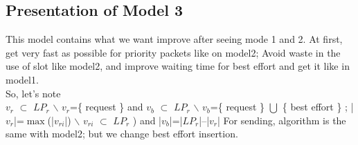 \documentclass{article}
\begin{document}
\subsection{Presentation of Model 3}
This model contains what we want improve after seeing mode 1 and 2. At first, get very fast as possible for priority packets like on model2; Avoid waste in the use of slot like model2, and improve waiting time for best effort and get it like in model1.\\
So, let's note\\
 $v_{r}$ $\subset$ $LP_{r}$ $\backslash$ $v_{r}$=\{ request \} and $v_{b}$ $\subset$ $LP_{r}$ $\backslash$ $v_{b}$=\{ request \} $\bigcup $ \{ best effort \} ; 
|$v_{r}$|=$\max$(|$v_{ri}$|) $\backslash$ $v_{ri}$  $\subset$ $LP_{r}$ ) and |$v_{b}$|=|$LP_{r}$|--|$v_{r}$|
For sending, algorithm is the same with model2; but we change best effort  insertion.
\end{document}
